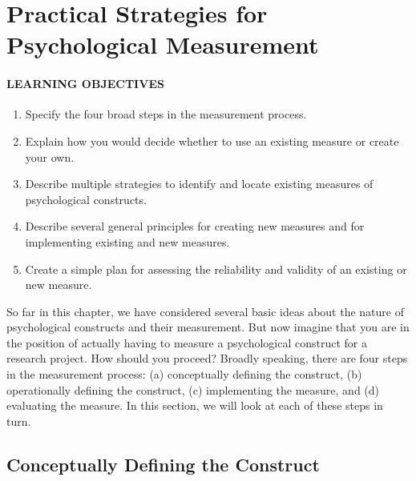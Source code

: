 \documentclass[
]{krantz}
\providecommand{\tightlist}{%
  \setlength{\itemsep}{0pt}\setlength{\parskip}{0pt}}
\begin{document}
\hypertarget{practical-strategies-for-psychological-measurement}{%
\section{Practical Strategies for Psychological Measurement}\label{practical-strategies-for-psychological-measurement}}

\hypertarget{learning-objectives-17}{%
\paragraph*{LEARNING OBJECTIVES}\label{learning-objectives-17}}

\begin{enumerate}
\def\labelenumi{\arabic{enumi}.}
\tightlist
\item
  Specify the four broad steps in the measurement process.
\item
  Explain how you would decide whether to use an existing measure or create your own.
\item
  Describe multiple strategies to identify and locate existing measures of psychological constructs.
\item
  Describe several general principles for creating new measures and for implementing existing and new measures.
\item
  Create a simple plan for assessing the reliability and validity of an existing or new measure.
\end{enumerate}

So far in this chapter, we have considered several basic ideas about the nature of psychological constructs and their measurement. But now imagine that you are in the position of actually having to measure a psychological construct for a research project. How should you proceed? Broadly speaking, there are four steps in the measurement process: (a) conceptually defining the construct, (b) operationally defining the construct, (c) implementing the measure, and (d) evaluating the measure. In this section, we will look at each of these steps in turn.

\hypertarget{conceptually-defining-the-construct}{%
\subsection*{Conceptually Defining the Construct}\label{conceptually-defining-the-construct}}
\end{document}

